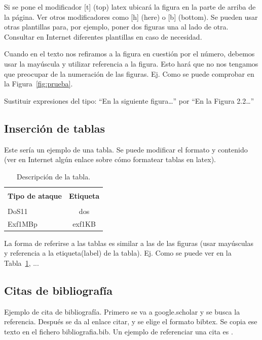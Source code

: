 Si se pone el modificador [t] (top) latex ubicará la figura en la parte de arriba de la página. Ver otros modificadores como [h] (here) o [b] (bottom). Se pueden usar otras plantillas para, por ejemplo, poner dos figuras una al lado de otra. Consultar en Internet diferentes plantillas en caso de necesidad. 

Cuando en el texto nos refiramos a la figura en cuestión por el número, debemos usar la mayúscula y utilizar referencia a la figura. Esto hará que no nos tengamos que preocupar de la numeración de las figuras. Ej. Como se puede comprobar en la Figura~\ref{fig:prueba}.

Sustituir expresiones del tipo: “En la siguiente figura…” por “En la Figura 2.2…”


\subsection*{Inserción de tablas}

Este sería un ejemplo de una tabla. Se puede modificar el formato y contenido (ver en Internet algún enlace sobre cómo formatear tablas en latex). 

\begin{table}[t]
	\caption{Descripción de la tabla.}
	\label{table:prueba}
	\centering
	\begin{tabular}{l  c} 
		\hline \\[-1.5ex]
		\textbf{Tipo de ataque} & \textbf{Etiqueta} \\ [1ex] 
		\hline\hline \\[-1.5ex]
		DoS11 & dos \\ [0.5ex]
		Exf1MBp & exf1KB \\ [1ex]
		\hline
	\end{tabular}
\end{table}

La forma de referirse a las tablas es similar a las de las figuras (usar mayúsculas y referencia a la etiqueta(label) de la tabla). Ej. Como se puede ver en la Tabla~\ref{table:prueba}, ...


\subsection*{Citas de bibliografía}
Ejemplo de cita de bibliografía. Primero se va a google.scholar y se busca la referencia. Después se da al enlace citar, y se elige el formato bibtex. Se copia ese texto en el fichero bibliografia.bib. Un ejemplo de referenciar una cita es \cite{macia2008evaluation}.


